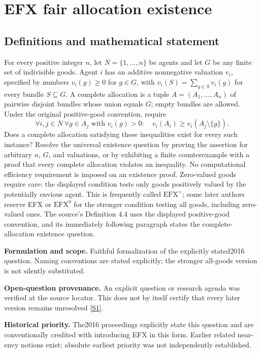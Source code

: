 \documentclass[11pt]{article}
\newcommand{\sref}[2]{\hyperlink{source:#1:#2}{[S#2]}}
\begin{document}
\section*{EFX fair allocation existence}\label{30007558}
\subsection{Definitions and mathematical statement}
For every positive integer \(n\), let \(N=\{1,\ldots,n\}\) be agents and let \(G\) be any finite set of indivisible goods. Agent \(i\) has an additive nonnegative valuation \(v_i\), specified by numbers \(v_i(g)\geq0\) for \(g\in G\), with \(v_i(S)=\sum_{g\in S}v_i(g)\) for every bundle \(S\subseteq G\). A complete allocation is a tuple \(A=(A_1,\ldots,A_n)\) of pairwise disjoint bundles whose union equals \(G\); empty bundles are allowed. Under the original positive-good convention, require
\[
 \forall i,j\in N\ \forall g\in A_j\text{ with }v_i(g)>0:
 \quad v_i(A_i)\geq v_i(A_j\setminus\{g\}).
\]
Does a complete allocation satisfying these inequalities exist for every such instance? Resolve the universal existence question by proving the assertion for arbitrary \(n\), \(G\), and valuations, or by exhibiting a finite counterexample with a proof that every complete allocation violates an inequality. No computational efficiency requirement is imposed on an existence proof. Zero-valued goods require care: the displayed condition tests only goods positively valued by the potentially envious agent. This is frequently called \(\mathrm{EFX}^{+}\); some later authors reserve EFX or \(\mathrm{EFX}^{0}\) for the stronger condition testing all goods, including zero-valued ones. The source’s Definition 4.4 uses the displayed positive-good convention, and its immediately following paragraph states the complete-allocation existence question.

\par\textbf{Formulation and scope.} Faithful formalization of the explicitly stated2016 question. Naming conventions are stated explicitly; the stronger all-goods version is not silently substituted.

\par\textbf{Open-question provenance.} An explicit question or research agenda was verified at the source locator. This does not by itself certify that every later version remains unresolved \sref{30007558}{1}.

\par\textbf{Historical priority.} The2016 proceedings explicitly state this question and are conventionally credited with introducing EFX in this form. Earlier related near-envy notions exist; absolute earliest priority was not independently established.
\end{document}
